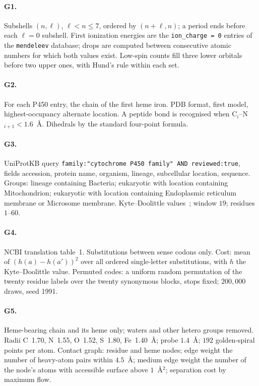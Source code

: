 \documentclass[10pt,twocolumn,a4paper]{article}
\begin{document}
\paragraph{G1.} Subshells $(n,\ell)$, $\ell<n\le7$, ordered by $(n+\ell,n)$;
a period ends before each $\ell=0$ subshell. First ionization energies are
the \texttt{ion\_charge = 0} entries of the \texttt{mendeleev} database;
drops are computed between consecutive atomic numbers for which both values
exist. Low-spin counts fill three lower orbitals before two upper ones, with
Hund's rule within each set.

\paragraph{G2.} For each P450 entry, the chain of the first heme iron. PDB
format, first model, highest-occupancy alternate location. A peptide bond is
recognised when C$_i$--N$_{i+1}<1.6$~\AA. Dihedrals by the standard
four-point formula.

\paragraph{G3.} UniProtKB query
\texttt{family:"cytochrome P450 family" AND reviewed:true}, fields accession,
protein name, organism, lineage, subcellular location, sequence. Groups:
lineage containing Bacteria; eukaryotic with location containing
Mitochondrion; eukaryotic with location containing Endoplasmic reticulum
membrane or Microsome membrane. Kyte--Doolittle values~\citep{kyte1982};
window $19$; residues $1$--$60$.

\paragraph{G4.} NCBI translation table~1. Substitutions between sense codons
only. Cost: mean of $(h(a)-h(a'))^2$ over all ordered single-letter
substitutions, with $h$ the Kyte--Doolittle value. Permuted codes: a uniform
random permutation of the twenty residue labels over the twenty synonymous
blocks, stops fixed; $200{,}000$ draws, seed 1991.

\paragraph{G5.} Heme-bearing chain and its heme only; waters and other
hetero groups removed. Radii C~1.70, N~1.55, O~1.52, S~1.80, Fe~1.40~\AA;
probe $1.4$~\AA; $192$ golden-spiral points per atom. Contact graph: residue
and heme nodes; edge weight the number of heavy-atom pairs within
$4.5$~\AA; medium edge weight the number of the node's atoms with accessible
surface above $1$~\AA$^2$; separation cost by maximum flow.
\end{document}
